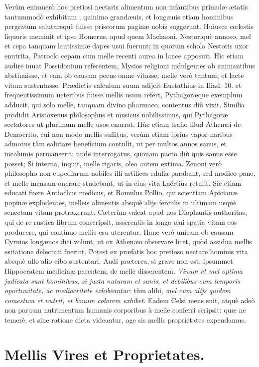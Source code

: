 \documentclass[a4paper, 11pt, oneside, polutonikogreek, latin]{article}
\begin{document}
Verùm enimuerò hoc pretiosi nectaris alimentum non infantibus primulæ ætatis tantummodò exhibitum , quinimo grandæuis, et longæuis etiam hominibus pergratum salutarequè fuisse priscorum paginæ nobis suggerunt. Huiusce cœlestis liquoris meminit et ipse Homerus, apud quem Machaoni, Nestoriquè annoso, mel et cepa tanquam lautissimæ dapes usui fuerunt; in quorum schola Nestoris uxor enutrita, Patroclo cepam cum melle recenti aurea in lance apposuit. Hìc etiam audire iuuat Possidonium referentem, Mysios religioni indulgentes ab animantibus abstinuisse, et eam ob causam pecus omne vitasse; melle verò tantum, et lacte vitam sustentasse. Prædictis calculum suum adijcit Eustathius in Iliad. 10. et frequentissimum ueteribus fuisse mellis usum refert, Pythagoræque exemplum adducit, qui solo melle, tanquam divino pharmaco, contentus diù vixit. Similia prodidit Aristoxenus philosophus et musicus nobilissimus, qui Pythagoræ sectatores ut plurimum melle usos enarrat. Hùc etiam traho illud Athenæi de Democrito, cui non modo mellis suffitus, verùm etiam ipsius vapor naribus admotus tàm salutare beneficium contulit, ut per multos annos sanus, et incolumis permanserit: unde interrogatus, quonam pacto diù quis sanus esse posset; Si interna, inquit, melle rigaris, oleo autem extima. Zenoni verò philosopho non cupediarum nobiles illi artifices edulia parabant, sed modico pane, et melle mensam onerare studebant, ut in eius vita Laërtius retulit. Sic etiam educati fuere Antiochus medicus, et Romulus Pollio, qui scientiam Apicianæ popinæ explodentes, melleis alimentis absquè alijs ferculis in ultimam usquè senectam vitam protraxerunt. Cæterùm valeat apud nos Diophantis authoritas, qui de re rustica librum conscripsit, asserentis in longa æui spatia vitam eos producere, qui continuo mellis esu uterentur. Hanc verò unicam ob causam Cyrnios longæuos dici volunt, ut ex Athenæo observare licet, quòd assidua mellis esitatione delectati fuerint. Potest ex præfatis hoc pretioso nectare hominis vita absquè ullo alio cibo sustentari. Audi præterea, si grave non est, ipsummet Hippocratem medicinæ parentem, de melle disserentem. \emph{Vinum et mel optima judicata sunt hominibus, si juxta naturam et sanis, et debilibus cum temporis oportunitate, ac mediocritate exhibeantur}: tùm alibi, \emph{mel cum alijs quidem comestum et nutrit, et bonum colorem exhibet}. Eadem Celsi mens suit, atquè adeò non paruum nutrimentum humanis corporibus à melle conferri scripsit; quæ ne temerè, et sine ratione dicta videantur, age sis mellis proprietates expendamus.
\clearpage
\section{Mellis Vires et Proprietates.}
\end{document}
